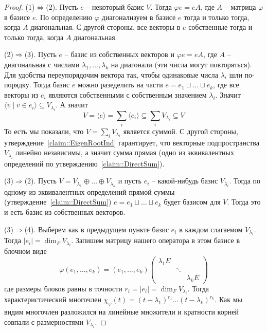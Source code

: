 \begin{proof}
(1)$\Leftrightarrow$(2).
Пусть $e$ -- некоторый базис $V$.
Тогда $\varphi e = e A$, где $A$ -- матрица $\varphi$ в базисе $e$.
По определению $\varphi$ диагонализуем в базисе $e$ тогда и только тогда, когда $A$ диагональная.
С другой стороны, все векторы в $e$ собственные тогда и только тогда, когда $A$ диагональная.

(2)$\Rightarrow$(3).
Пусть $e$ -- базис из собственных векторов и $\varphi e = e A$, где $A$ -- диагональная с числами $\lambda_1,\ldots,\lambda_k$ на диагонали (эти числа могут повторяться).
Для удобства переупорядочим вектора так, чтобы одинаковые числа $\lambda_i$ шли по-порядку.
Тогда базис $e$ можно разеделить на части $e = e_1 \sqcup \ldots \sqcup e_k$, где все векторы из $e_i$ являются собственными с собственным значением $\lambda_i$.
Значит $\langle v\mid v\in e_i\rangle\subseteq V_{\lambda_i}$.
А значит 
\[
V = \langle e \rangle = \sum_i \langle e_i\rangle \subseteq  \sum_i V_{\lambda_i} \subseteq V
\]
То есть мы показали, что $V = \sum_i V_{\lambda_i}$ является суммой.
С другой стороны, утверждение~\ref{claim::EigenRootInd} гарантирует, что векторные подпространства $V_{\lambda_i}$ линейно независимы, а значит сумма прямая (одно из эквивалентных определений по утверждению~\ref{claim::DirectSum}).

(3)$\Rightarrow$(2).
Пусть $V = V_{\lambda_1}\oplus \ldots \oplus V_{\lambda_k}$ и пусть $e_i$ -- какой-нибудь базис $V_{\lambda_i}$.
Тогда по одному из эквивалентных определений прямой суммы (утверждение~\ref{claim::DirectSum}) $e = e_1 \sqcup\ldots \sqcup e_k$ будет базисом для $V$.
Тогда это и есть базис из собственных векторов.

(3)$\Rightarrow$(4).
Выберем как в предыдущем пункте базис $e_i$ в каждом слагаемом $V_{\lambda_i}$.
Тогда $|e_i| = \dim_F V_{\lambda_i}$.
Запишем матрицу нашего оператора в этом базисе в блочном виде
\[
\varphi(e_1,\ldots,e_k)
=
(e_1,\ldots,e_k)
\begin{pmatrix}
{\lambda_1 E}&{}&{}\\
{}&{\ddots}&{}\\
{}&{}&{\lambda_k E}
\end{pmatrix}
\]
где размеры блоков равны в точности $r_i=|e_i| = \dim_F V_{\lambda_i}$.
Тогда характеристический многочлен $\chi_\varphi(t) = (t-\lambda_1)^{r_1}\ldots(t-\lambda_k)^{r_k}$.
Как мы видим многочлен разложился на линейные множители и кратности корней совпали с размерностями $V_{\lambda_i}$.


\end{proof}

